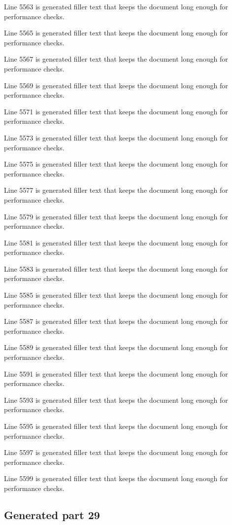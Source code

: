 Line 5563 is generated filler text that keeps the document long enough for performance checks.

Line 5565 is generated filler text that keeps the document long enough for performance checks.

Line 5567 is generated filler text that keeps the document long enough for performance checks.

Line 5569 is generated filler text that keeps the document long enough for performance checks.

Line 5571 is generated filler text that keeps the document long enough for performance checks.

Line 5573 is generated filler text that keeps the document long enough for performance checks.

Line 5575 is generated filler text that keeps the document long enough for performance checks.

Line 5577 is generated filler text that keeps the document long enough for performance checks.

Line 5579 is generated filler text that keeps the document long enough for performance checks.

Line 5581 is generated filler text that keeps the document long enough for performance checks.

Line 5583 is generated filler text that keeps the document long enough for performance checks.

Line 5585 is generated filler text that keeps the document long enough for performance checks.

Line 5587 is generated filler text that keeps the document long enough for performance checks.

Line 5589 is generated filler text that keeps the document long enough for performance checks.

Line 5591 is generated filler text that keeps the document long enough for performance checks.

Line 5593 is generated filler text that keeps the document long enough for performance checks.

Line 5595 is generated filler text that keeps the document long enough for performance checks.

Line 5597 is generated filler text that keeps the document long enough for performance checks.

Line 5599 is generated filler text that keeps the document long enough for performance checks.

\subsection{Generated part 29}

